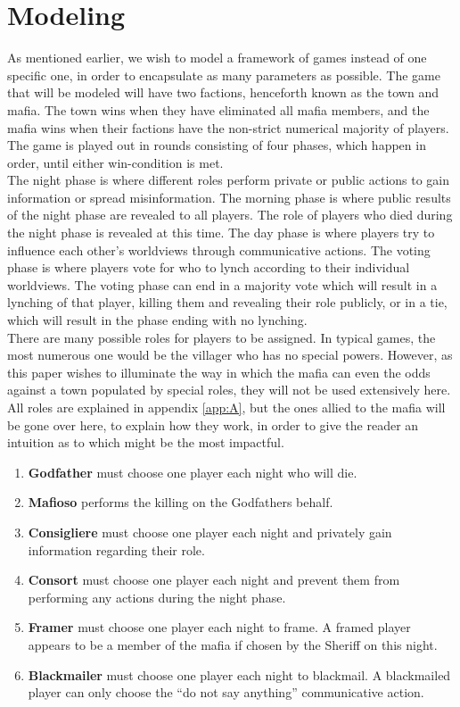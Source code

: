 \section{Modeling}
As mentioned earlier, we wish to model a framework of games instead of one
specific one, in order to encapsulate as many parameters as possible. The game
that will be modeled will have two factions, henceforth known as the town and
mafia. The town wins when they have eliminated all mafia members, and the mafia
wins when their factions have the non-strict numerical majority of players. The
game is played out in rounds consisting of four phases, which happen in order,
until either win-condition is met. \\
The night phase is where different roles
perform private or public actions to gain information or spread misinformation.
The morning phase is where public results of the night phase are revealed to
all players. The role of players who died during the night phase is revealed at
this time. The day phase is where players try to influence each other's
worldviews through communicative actions. The voting phase is where players
vote for who to lynch according to their individual worldviews. The voting
phase can end in a majority vote which will result in a lynching of that
player, killing them and revealing their role publicly, or in a tie, which will
result in the phase ending with no lynching. \\
There are many possible roles for 
players to be assigned. In typical games, the most numerous one would be the 
villager who has no special powers. However, as this paper wishes to illuminate 
the way in which the mafia can even the odds against a town populated by 
special roles, they will not be used extensively here. All roles are explained 
in appendix \ref{app:A}, but the ones allied to the mafia will be gone over 
here, to explain how they work, in order to give the reader an intuition as to 
which might be the most impactful.\\ 
\begin{enumerate}
	\item\textbf{Godfather} must choose one player each night who will die.
	\item\textbf{Mafioso} performs the killing on the Godfathers behalf.
	\item\textbf{Consigliere} must choose one player each night and privately 
	gain information regarding their role. 
	\item\textbf{Consort} must choose one player each night and prevent them 
	from performing any actions during the night phase.
	\item\textbf{Framer} must choose one player each night to frame. A framed 
	player appears to be a member of the mafia if chosen by the Sheriff on this 
	night.
	\item\textbf{Blackmailer} must choose one player each night to blackmail. A 
	blackmailed player can only choose the “do not say anything” communicative 
	action. 
\end{enumerate}

